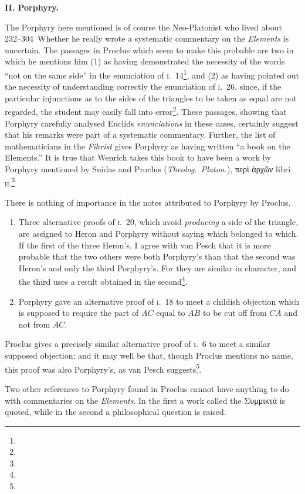 \textbf{II. Porphyry.}

The Porphyry here mentioned is of course the Neo-Platonist who lived about 232--304~\ad\@ Whether he really wrote a systematic commentary on the \emph{Elements} is uncertain. The passages in Proclus which seem to make this probable are two in which he mentions him (1) as having demonstrated the necessity of the words ``not on the same side'' in the enunciation of \textsc{i.}~14\footnote{}, and (2) as having pointed out the necessity of understanding correctly the enunciation of \textsc{i}.~26, since, if the particular injunctions as to the sides of the triangles to be taken as equal are not regarded, the student may easily fall into error\footnote{}. These passages, showing that Porphyry carefully analysed Euclids \emph{enunciations} in these cases, certainly suggest that his remarks were part of a systematic commentary. Further, the list of mathematicians in the \emph{Fihrist} gives Porphyry as having written ``a book on the Elements.'' It is true that Wenrich takes this book to have been a work by Porphyry mentioned by Suidas and Proclus (\emph{Theolog.\ Platon.}), περὶ ἀρχῶν libri \textsc{ii}.\footnote{}

There is nothing of importance in the notes attributed to Porphyry by Proclus.

\begin{enumerate}[label=(\arabic*)]
	\item Three alternative proofs of \textsc{i}.~20, which avoid \emph{producing} a side of the triangle, are assigned to Heron and Porphyry without saying which belonged to which. If the first of the three Heron's, I agree with van Pesch that it is more probable that the two others were both Porphyry's than that the second was Heron's and only the third Porphyry's. For they are similar in character, and the third uses a result obtained in the second\footnote{}.
	\item Porphyry gave an alternative proof of \textsc{i}.~18 to meet a childish objection which is supposed to require the part of \(AC\) equal to \(AB\) to be cut off from \(CA\) and not from \(AC\).
\end{enumerate}

Proclus gives a precisely similar alternative proof of \textsc{i}.~6 to meet a similar supposed objection; and it may well be that, though Proclus mentions no name, this proof was also Porphyry's, as van Pesch suggests\footnote{}.

Two other references to Porphyry found in Proclus cannot have anything to do with commentaries on the \emph{Elements}. In the first a work called the Συμμικτά is quoted, while in the second a philosophical question is raised.

